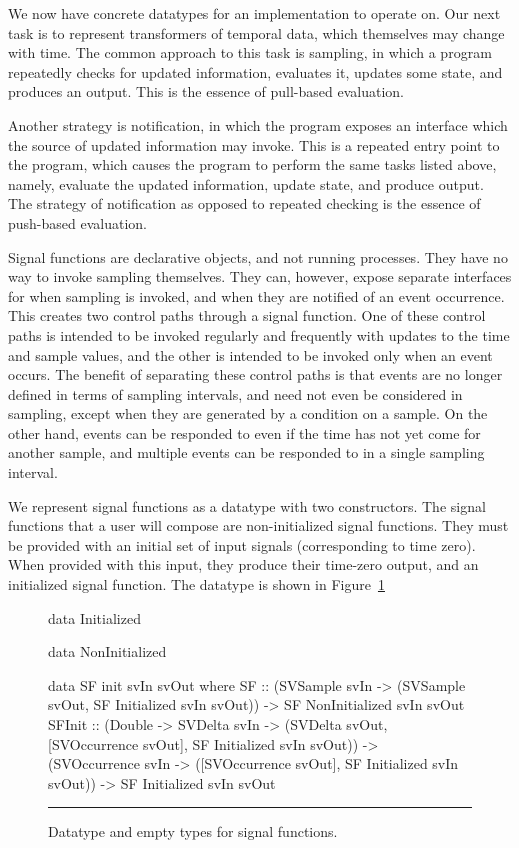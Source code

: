 We now have concrete datatypes for an implementation to operate on. Our next
task is to represent transformers of temporal data, which themselves may change
with time. The common approach to this task is sampling, in which a program
repeatedly checks for updated information, evaluates it, updates some state,
and produces an output. This is the essence of pull-based evaluation.

Another strategy is notification, in which the program exposes an interface
which the source of updated information may invoke. This is a repeated entry
point to the program, which causes the program to perform the same tasks
listed above, namely, evaluate the updated information, update state, and
produce output. The strategy of notification as opposed to repeated checking is
the essence of push-based evaluation.

Signal functions are declarative objects, and not running processes. They have
no way to invoke sampling themselves. They can, however, expose separate
interfaces for when sampling is invoked, and when they are notified of an event
occurrence. This creates two control paths through a signal function. One of
these control paths is intended to be invoked regularly and frequently with
updates to the time and sample values, and the other is intended to be invoked
only when an event occurs. The benefit of separating these control paths is that
events are no longer defined in terms of sampling intervals, and need not even
be considered in sampling, except when they are generated by a condition on a
sample. On the other hand, events can be responded to even if the time has not
yet come for another sample, and multiple events can be responded to in a single
sampling interval.

We represent signal functions as a datatype with two constructors.
The signal functions that a user will compose are non-initialized signal
functions. They must be provided with an initial set of input signals
(corresponding to time zero). When provided with this input, they produce their
time-zero output, and an initialized signal function. The datatype is shown in
Figure~\ref{figure:signal_function_datatype}

\begin{figure}
\begin{code}
data Initialized

data NonInitialized

data SF init svIn svOut where
  SF     ::    (SVSample svIn 
                  -> (SVSample svOut,
                      SF Initialized svIn svOut)) 
            -> SF NonInitialized svIn svOut
  SFInit ::    (Double 
                  -> SVDelta svIn
                  -> (SVDelta svOut,
                      [SVOccurrence svOut],
                      SF Initialized svIn svOut)) 
            -> (SVOccurrence svIn
                  -> ([SVOccurrence svOut],
                      SF Initialized svIn svOut))
            -> SF Initialized svIn svOut
\end{code}
\hrule
\caption{Datatype and empty types for signal functions.}
\label{figure:signal_function_datatype}
\end{figure}

